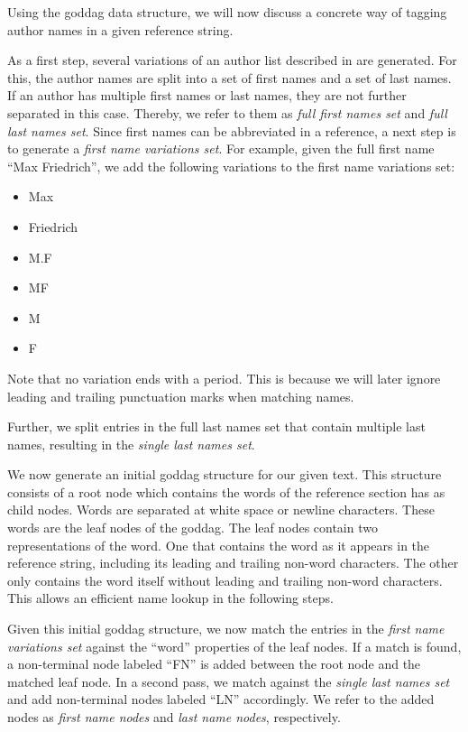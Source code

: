 \bigskip

Using the \gls{goddag} data structure, we will now discuss a concrete way of tagging author names in a given reference string.

As a first step, several variations of an author list described in  are generated.
For this, the author names are split into a set of first names and a set of last names.
If an author has multiple first names or last names, they are not further separated in this case.
Thereby, we refer to them as \textit{full first names set} and \textit{full last names set}.
Since first names can be abbreviated in a reference, a next step is to generate a \textit{first name variations set}.
For example, given the full first name ``Max Friedrich'', we add the following variations to the first name variations set:
\begin{itemize}
  \itemsep0em
  \item Max
  \item Friedrich
  \item M.F
  \item MF
  \item M
  \item F
\end{itemize}
Note that no variation ends with a period.
This is because we will later ignore leading and trailing punctuation marks when matching names.

Further, we split entries in the full last names set that contain multiple last names, resulting in the \textit{single last names set}.

\bigskip

We now generate an initial \gls{goddag} structure for our given text.
This structure consists of a root node which contains the words of the reference section has as child nodes.
Words are separated at white space or newline characters.
These words are the leaf nodes of the \gls{goddag}.
The leaf nodes contain two representations of the word.
One that contains the word as it appears in the reference string, including its leading and trailing non-word characters.
The other only contains the word itself without leading and trailing non-word characters.
This allows an efficient name lookup in the following steps.

Given this initial \gls{goddag} structure, we now match the entries in the \textit{first name variations set} against the ``word'' properties of the leaf nodes.
If a match is found, a non-terminal node labeled ``FN'' is added between the root node and the matched leaf node.
In a second pass, we match against the \textit{single last names set} and add non-terminal nodes labeled ``LN'' accordingly.
We refer to the added nodes as \textit{first name nodes} and \textit{last name nodes}, respectively.

